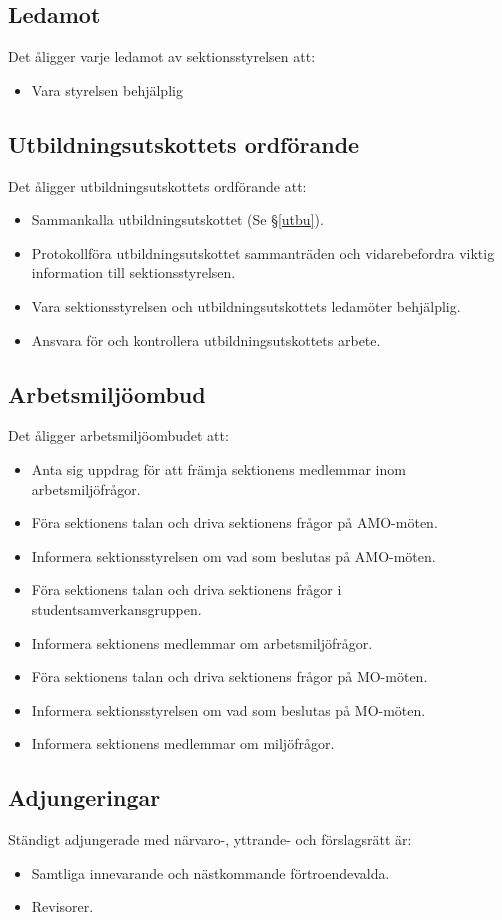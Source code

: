 \documentclass{datateknologsektionen-document}
\begin{document}
\subsection{Ledamot}
\label{ledamot}
Det åligger varje ledamot av sektionsstyrelsen att:
\begin{itemize}
  \item Vara styrelsen behjälplig
\end{itemize}
\subsection{Utbildningsutskottets ordförande}
\label{utbuordf}
Det åligger utbildningsutskottets ordförande att:
\begin{itemize}
  \item Sammankalla utbildningsutskottet (Se \S \ref{utbu}).
  \item Protokollföra utbildningsutskottet sammanträden och vidarebefordra viktig information till sektionsstyrelsen.
  \item Vara sektionsstyrelsen och utbildningsutskottets ledamöter behjälplig.
  \item Ansvara för och kontrollera utbildningsutskottets arbete.
\end{itemize}
\subsection{Arbetsmiljöombud}
\label{amo}
Det åligger arbetsmiljöombudet att:
\begin{itemize}
  \item Anta sig uppdrag för att främja sektionens medlemmar inom arbetsmiljöfrågor.
  \item Föra sektionens talan och driva sektionens frågor på AMO-möten.
  \item Informera sektionsstyrelsen om vad som beslutas på AMO-möten.
  \item Föra sektionens talan och driva sektionens frågor i studentsamverkansgruppen.
  \item Informera sektionens medlemmar om arbetsmiljöfrågor.
  \item Föra sektionens talan och driva sektionens frågor på MO-möten.
  \item Informera sektionsstyrelsen om vad som beslutas på MO-möten.
  \item Informera sektionens medlemmar om miljöfrågor.
\end{itemize}
\subsection{Adjungeringar}
Ständigt adjungerade med närvaro-, yttrande- och förslagsrätt är:
\begin{itemize}
  \item Samtliga innevarande och nästkommande förtroendevalda.
  \item Revisorer.
\end{itemize}
\end{document}
